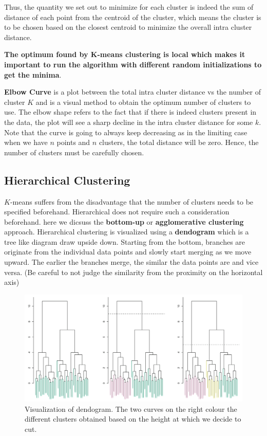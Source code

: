 \documentclass[11pt, a4paper]{article}
\begin{document}
    Thus, the quantity we set out to minimize for each cluster is indeed the sum of distance of each point from the centroid of the cluster, which means the cluster is to be chosen based on the closest centroid to minimize the overall intra cluster distance.\newline

    \textbf{The optimum found by K-means clustering is local which makes it important to run the algorithm with different random initializations to get the minima}.\newline

    \textbf{Elbow Curve} is a plot between the total intra cluster distance vs the number of cluster $K$ and is a visual method to obtain the optimum number of clusters to use. The elbow shape refers to the fact that if there is indeed clusters present in the data, the plot will see a sharp decline in the intra cluster distance for some $k$.\newline
    Note that the curve is going to always keep decreasing as in the limiting case when we have $n$ points and $n$ clusters, the total distance will be zero. Hence, the number of clusters must be carefully chosen.


    \subsection{Hierarchical Clustering}
    $K$-means suffers from the disadvantage that the number of clusters needs to be specified beforehand. Hierarchical does not require such a consideration beforehand. here we dicsuss the \textbf{bottom-up} or \textbf{agglomerative clustering} approach. Hierarchical clustering is visualized using a \textbf{dendogram} which is a tree like diagram draw upside down. Starting from the bottom, branches are originate from the individual data points and slowly start merging as we move upward. The earlier the branches merge, the similar the data points are and vice versa. (Be careful to not judge the similarity from the proximity on the horizontal axis)\newline

    \begin{figure}[h]
    \includegraphics[scale=0.5]{dendogram}
    \centering
    \caption{Visualization of dendogram. The two curves on the right colour the different clusters obtained based on the height at which we decide to cut.}
    \label{fig:dendogram} %
    \end{figure}
\end{document}
